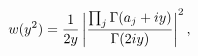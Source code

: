 \[w(y^{2})=\frac{1}{2y}\left|\frac{\prod_{j}\mathop{\Gamma\/}\nolimits\!\left(a_%
{j}+iy\right)}{\mathop{\Gamma\/}\nolimits\!\left(2iy\right)}\right|^{2},\]